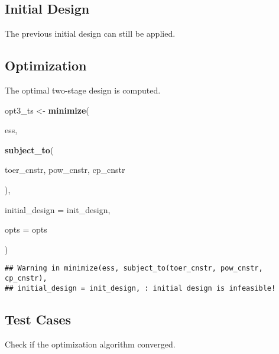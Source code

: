 \documentclass[]{book}
\newenvironment{Shaded}{\begin{snugshade}}{\end{snugshade}}
\newcommand{\DataTypeTok}[1]{\textcolor[rgb]{0.13,0.29,0.53}{#1}}
\newcommand{\KeywordTok}[1]{\textcolor[rgb]{0.13,0.29,0.53}{\textbf{#1}}}
\newcommand{\NormalTok}[1]{#1}
\newcommand{\OperatorTok}[1]{\textcolor[rgb]{0.81,0.36,0.00}{\textbf{#1}}}
\newcommand{\StringTok}[1]{\textcolor[rgb]{0.31,0.60,0.02}{#1}}
\begin{document}
\hypertarget{initial-design-5}{%
\subsection{Initial Design}\label{initial-design-5}}

The previous initial design can still be applied.

\hypertarget{optimization-5}{%
\subsection{Optimization}\label{optimization-5}}

The optimal two-stage design is computed.

\begin{Shaded}
\begin{Highlighting}[]
\NormalTok{opt3_ts <-}\StringTok{ }\KeywordTok{minimize}\NormalTok{(}
        
\NormalTok{        ess,}
        
        \KeywordTok{subject_to}\NormalTok{(}
            
\NormalTok{            toer_cnstr,}
\NormalTok{            pow_cnstr,}
\NormalTok{            cp_cnstr}
            
\NormalTok{        ),}
        
        \DataTypeTok{initial_design =}\NormalTok{ init_design,}
        
        \DataTypeTok{opts =}\NormalTok{ opts}
        
\NormalTok{)}
\end{Highlighting}
\end{Shaded}

\begin{verbatim}
## Warning in minimize(ess, subject_to(toer_cnstr, pow_cnstr, cp_cnstr),
## initial_design = init_design, : initial design is infeasible!
\end{verbatim}

\hypertarget{test-cases-5}{%
\subsection{Test Cases}\label{test-cases-5}}

Check if the optimization algorithm converged.

\begin{Shaded}
\end{Shaded}
\end{document}

